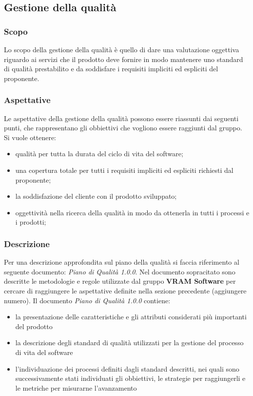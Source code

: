 \subsection{Gestione della qualità}
\subsubsection{Scopo}
Lo scopo della gestione della qualità è quello di dare una valutazione oggettiva riguardo ai servizi che il prodotto deve fornire in modo mantenere uno standard di qualità prestabilito e da soddisfare i requisiti impliciti ed espliciti del proponente.
\subsubsection{Aspettative}
Le aspettative della gestione della qualità possono essere riassunti dai seguenti punti, che rappresentano gli obbiettivi che vogliono essere raggiunti dal gruppo. Si vuole ottenere:
\begin{itemize}
	\item qualità per tutta la durata del ciclo di vita del software;
	\item una copertura totale per tutti i requisiti impliciti ed espliciti richiesti dal proponente;
	\item la soddisfazione del cliente con il prodotto sviluppato;
	\item oggettività nella ricerca della qualità in modo da ottenerla in tutti i processi e i prodotti;
\end{itemize}
\subsubsection{Descrizione}
Per una descrizione approfondita sul piano della qualità si faccia riferimento al seguente documento: \textit{Piano di Qualità 1.0.0}.
Nel documento sopracitato sono descritte le metodologie e regole utilizzate dal gruppo \textbf{VRAM Software} per cercare di raggiungere le aspettative definite nella sezione precedente (aggiungere numero).
Il documento \textit{Piano di Qualità 1.0.0} contiene:
\begin{itemize}
	\item la presentazione delle caratteristiche e gli attributi considerati più importanti del prodotto
	\item la descrizione degli standard di qualità utilizzati per la gestione del processo di vita del software
	\item l'individuazione dei processi definiti dagli standard descritti, nei quali sono successivamente stati individuati gli obbiettivi, le strategie per raggiungerli e le metriche per misurarne l'avanzamento
\end{itemize}

